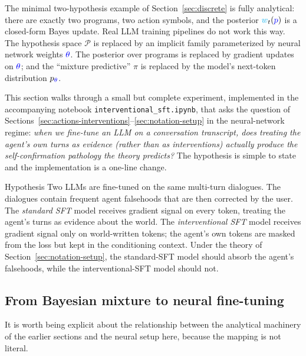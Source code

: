 \documentclass[11pt]{article}
\newcommand{\ProgramSet}{\mathcal{P}}
\newcommand{\program}{\ensuremath{\textcolor{blue}{p}}}
\newcommand{\weight}{\ensuremath{\textcolor{cyan}{w}}}
\newcommand{\thetap}{\ensuremath{\textcolor{blue}{\theta}}}
\newcommand{\policy}{\ensuremath{\pi}}
\begin{document}
The minimal two-hypothesis example of Section~\ref{sec:discrete} is fully
analytical: there are exactly two programs, two action symbols, and the
posterior $\weight_t(\program)$ is a closed-form Bayes update. Real LLM training
pipelines do not work this way. The hypothesis space $\ProgramSet$ is replaced
by an implicit family parameterized by neural network weights ${\thetap}$. The
posterior over programs is replaced by gradient updates on ${\thetap}$; and the
``mixture predictive'' $\policy$ is replaced by the model's next-token
distribution $p_{\thetap}$.

This section walks through a small but complete experiment, implemented in the
accompanying notebook \texttt{interventional\_sft.ipynb}, that asks the question
of Sections~\ref{sec:actions-interventions}--\ref{sec:notation-setup} in the
neural-network regime: \emph{when we fine-tune an LLM on a conversation
transcript, does treating the agent's own turns as evidence (rather than as
interventions) actually produce the self-confirmation pathology the theory
predicts?} The hypothesis is simple to state and the implementation is a
one-line change.

\begin{keybox}{Hypothesis}
Two LLMs are fine-tuned on the same multi-turn dialogues. The dialogues
contain frequent agent falsehoods that are then corrected by the user. The
\emph{standard SFT} model receives gradient signal on every token, treating
the agent's turns as evidence about the world. The \emph{interventional SFT}
model receives gradient signal only on world-written tokens; the agent's own
tokens are masked from the loss but kept in the conditioning context. Under
the theory of Section~\ref{sec:notation-setup}, the standard-SFT model should
absorb the agent's falsehoods, while the interventional-SFT model should not.
\end{keybox}


\subsection{From Bayesian mixture to neural fine-tuning}
\label{sec:experiment-correspondence}

It is worth being explicit about the relationship between the analytical
machinery of the earlier sections and the neural setup here, because the
mapping is not literal.
\end{document}
